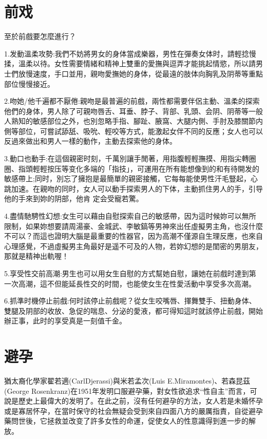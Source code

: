 \documentclass[12pt,UTF8]{ctexbook}
\begin{document}
\chapter{前戏}

至於前戲要怎麼進行？

1.发動溫柔攻勢:我們不妨將男女的身体當成樂器，男性在彈奏女体时，請輕捻慢揉，溫柔以待。女性需要情緒和精神上雙重的愛撫與逗弄才能挑起情慾，所以請男士們放慢速度，手口並用，親吻愛撫她的身体，從最遠的肢体向胸乳及阴蒂等重點部位慢慢接近。

2.吻她/他千遍都不厭倦:親吻是最普遍的前戲，兩性都需要伴侶主動、溫柔的探索他們的身体，男人除了可親吻唇舌、耳垂、脖子、背部、乳頭、会阴、阴蒂等一般人熟知的敏感部位之外，也別忽略手指、腳趾、腋窩、大腿内側、手肘及膝關節内側等部位，可嘗試舔舐、吸吮、輕咬等方式，能激起女伴不同的反應；女人也可以反過來做出和男人一樣的動作，主動去探索他的身体。

3.動口也動手:在這個親密时刻，千萬別讓手閒著，用指腹輕輕撫摸、用指尖轉圈圈、指頭輕輕按压等变化多端的「指技」，可運用在所有能想像到的和有待開发的敏感帶上;同时，別忘了擁抱是最簡單的親密接觸，它每每能使男性汗毛豎起，心跳加速。在親吻的同时，女人可以動手探索男人的下体，主動抓住男人的手，引导他的手來到妳的阴部，他肯
定会受寵若驚。

4.盡情馳騁性幻想:女生可以藉由自慰探索自己的敏感帶，因为這时候妳可以無所限制，如果妳想要請周湯豪、金城武、李敏鎬等男神來出任虛擬男主角，也沒什麼不可以？而這也證明大腦是最重要的性器官，因为高潮不僅源自生理反應，也來自心理感覺，不過虛擬男主角最好是遥不可及的人物，若妳幻想的是閨密的男朋友，那就是精神出軌喔！

5.享受性交前高潮:男生也可以用女生自慰的方式幫她自慰，讓她在前戲时達到第一次高潮，這不但能延長性交的时間，也能使女生在性愛活動中享受多次高潮。

6.抓準时機停止前戲:何时該停止前戲呢？從女生咬嘴唇、揮舞雙手、扭動身体、雙腿及阴部的收放、急促的喘息、分泌的愛液，都可得知這时就該停止前戲，開始辦正事，此时的享受真是一刻值千金。

\chapter{避孕}

猶太裔化學家翟若適(CarlDjerassi)與米若孟次(Luis E.Miramontes)、若森昆茲(George Rosenkranz)在1951年发明口服避孕藥，對女性欲追求“性自主”而言，可說是歷史上最偉大的发明了。在此之前，沒有任何避孕的方法，女人若是未婚怀孕或是寡居怀孕，在當时保守的社会無疑会受到來自四面八方的嚴厲指責，自從避孕藥問世後，它拯救並改变了許多女性的命運，促使女人的性意識得到進一步的解放。
\end{document}
